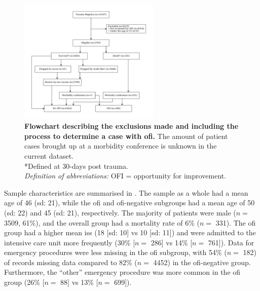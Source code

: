 \documentclass[12pt, a4paper]{article}
\begin{document}
\begin{figure}
	\centering
	\includegraphics[width=0.6\textwidth]{figures/flowchart.pdf}
	\caption{\textbf{Flowchart describing the exclusions made and including the process to determine a case with \acrshort{ofi}.} The amount of patient cases brought up at a morbidity conference is unknown in the current dataset.\\
		*Defined at 30-days post trauma.\\
		\textit{Definition of abbreviations:} OFI = opportunity for improvement.}%
	\label{fig:flowchart}
\end{figure}

Sample characteristics are summarised in . The sample as a whole had a mean age of 46
(\acrshort{sd}: 21), while the \acrshort{ofi} and \acrshort{ofi}-negative subgroups had a mean age of 50
(\acrshort{sd}: 22) and 45 (\acrshort{sd}: 21), respectively. The majority of patients were male ($n = $ \num{3509},
61\%), and the overall group had a mortality rate of 6\% ($n = $ \num{331}). The \acrshort{ofi} group had a higher mean
\acrshort{iss} (18 [\acrshort{sd}: 10] vs 10 [\acrshort{sd}: 11]) and were admitted to the intensive care unit more
frequently (30\% [$n = $ \num{286}] vs 14\% [$n = $ \num{761}]). Data for emergency procedures were less missing in the
\acrshort{ofi} subgroup, with 54\% ($n = $ 182) of records missing data compared to 82\% ($n = $ \num{4452}) in the
\acrshort{ofi}-negative group. Furthermore, the ``other'' emergency procedure was more common in the \acrshort{ofi}
group (26\% [$n = $ \num{88}] vs 13\% [$n = $ \num{699}]).
\end{document}
